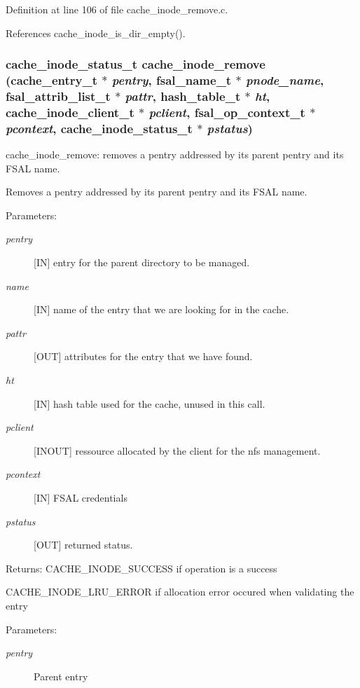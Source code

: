 Definition at line 106 of file cache\_\-inode\_\-remove.c.

References cache\_\-inode\_\-is\_\-dir\_\-empty().
\subsubsection{\setlength{\rightskip}{0pt plus 5cm}cache\_\-inode\_\-status\_\-t cache\_\-inode\_\-remove (cache\_\-entry\_\-t $\ast$ {\em pentry}, fsal\_\-name\_\-t $\ast$ {\em pnode\_\-name}, fsal\_\-attrib\_\-list\_\-t $\ast$ {\em pattr}, hash\_\-table\_\-t $\ast$ {\em ht}, cache\_\-inode\_\-client\_\-t $\ast$ {\em pclient}, fsal\_\-op\_\-context\_\-t $\ast$ {\em pcontext}, cache\_\-inode\_\-status\_\-t $\ast$ {\em pstatus})}\label{cache__inode__remove_8c_a4}


cache\_\-inode\_\-remove: removes a pentry addressed by its parent pentry and its FSAL name.

Removes a pentry addressed by its parent pentry and its FSAL name.

\begin{Desc}
\item[Parameters:]
\begin{description}
\item[{\em pentry}][IN] entry for the parent directory to be managed. \item[{\em name}][IN] name of the entry that we are looking for in the cache. \item[{\em pattr}][OUT] attributes for the entry that we have found. \item[{\em ht}][IN] hash table used for the cache, unused in this call. \item[{\em pclient}][INOUT] ressource allocated by the client for the nfs management. \item[{\em pcontext}][IN] FSAL credentials \item[{\em pstatus}][OUT] returned status.\end{description}
\end{Desc}
\begin{Desc}
\item[Returns:]CACHE\_\-INODE\_\-SUCCESS if operation is a success \par
 

CACHE\_\-INODE\_\-LRU\_\-ERROR if allocation error occured when validating the entry \end{Desc}
\begin{Desc}
\item[Parameters: ]\par
\begin{description}
\item[{\em 
pentry}]Parent entry \end{description}
\end{Desc}


